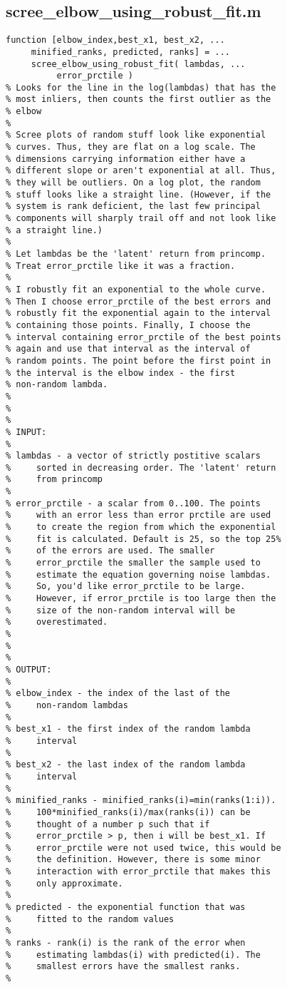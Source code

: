 \documentclass[eric_thesis.tex]{subfiles}
\begin{document}
\subsection{scree\_elbow\_using\_robust\_fit.m}
\begin{lstlisting}
function [elbow_index,best_x1, best_x2, ...
     minified_ranks, predicted, ranks] = ...
     scree_elbow_using_robust_fit( lambdas, ...
          error_prctile )
% Looks for the line in the log(lambdas) that has the
% most inliers, then counts the first outlier as the
% elbow
%
% Scree plots of random stuff look like exponential
% curves. Thus, they are flat on a log scale. The
% dimensions carrying information either have a
% different slope or aren't exponential at all. Thus,
% they will be outliers. On a log plot, the random
% stuff looks like a straight line. (However, if the
% system is rank deficient, the last few principal
% components will sharply trail off and not look like
% a straight line.)
% 
% Let lambdas be the 'latent' return from princomp.
% Treat error_prctile like it was a fraction.
% 
% I robustly fit an exponential to the whole curve.
% Then I choose error_prctile of the best errors and
% robustly fit the exponential again to the interval
% containing those points. Finally, I choose the
% interval containing error_prctile of the best points
% again and use that interval as the interval of
% random points. The point before the first point in
% the interval is the elbow index - the first
% non-random lambda.
%
%
%
% INPUT:
%
% lambdas - a vector of strictly postitive scalars 
%     sorted in decreasing order. The 'latent' return
%     from princomp
%
% error_prctile - a scalar from 0..100. The points
%     with an error less than error prctile are used
%     to create the region from which the exponential
%     fit is calculated. Default is 25, so the top 25%
%     of the errors are used. The smaller 
%     error_prctile the smaller the sample used to 
%     estimate the equation governing noise lambdas.
%     So, you'd like error_prctile to be large. 
%     However, if error_prctile is too large then the
%     size of the non-random interval will be
%     overestimated.
%
%
%
% OUTPUT:
%
% elbow_index - the index of the last of the 
%     non-random lambdas
%
% best_x1 - the first index of the random lambda 
%     interval
%
% best_x2 - the last index of the random lambda 
%     interval
%
% minified_ranks - minified_ranks(i)=min(ranks(1:i)).
%     100*minified_ranks(i)/max(ranks(i)) can be
%     thought of a number p such that if 
%     error_prctile > p, then i will be best_x1. If
%     error_prctile were not used twice, this would be
%     the definition. However, there is some minor
%     interaction with error_prctile that makes this
%     only approximate.
%
% predicted - the exponential function that was
%     fitted to the random values
%
% ranks - rank(i) is the rank of the error when
%     estimating lambdas(i) with predicted(i). The
%     smallest errors have the smallest ranks.
%


\end{lstlisting}
\end{document}
